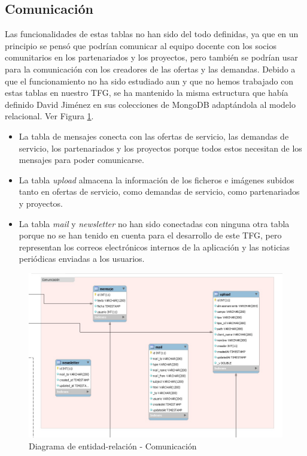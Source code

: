 \documentclass[11pt]{book}
\begin{document}
	\subsection{Comunicación}
	Las funcionalidades de estas tablas no han sido del todo definidas, ya que en un principio se pensó que podrían comunicar al equipo docente con los socios comunitarios en los partenariados y los proyectos, pero también se podrían usar para la comunicación con los creadores de las ofertas y las demandas. Debido a que el funcionamiento no ha sido estudiado aun y que no hemos trabajado con estas tablas en nuestro TFG, se ha mantenido la misma estructura que había definido David Jiménez en sus colecciones de MongoDB adaptándola al modelo relacional. Ver Figura \ref{fig:comunicacion}. 
	\begin{itemize} 
		\item La tabla de mensajes conecta con las ofertas de servicio, las demandas de servicio, los partenariados y los proyectos porque todos estos necesitan de los mensajes para poder comunicarse.
		\item La tabla \textit{upload} almacena la información de los ficheros e imágenes subidos tanto en ofertas de servicio, como demandas de servicio, como partenariados y proyectos.
		\item La tabla \textit{mail} y \textit{newsletter} no han sido conectadas con ninguna otra tabla porque no se han tenido en cuenta para el desarrollo de este TFG, pero representan los correos electrónicos internos de la aplicación y las noticias periódicas enviadas a los usuarios.
	\end{itemize}
	\begin{figure}[t]
		\centering
		\includegraphics[scale=0.6]{comunicacion}
		\caption{Diagrama de entidad-relación - Comunicación}
		\label{fig:comunicacion}
	\end{figure}
	
\end{document}
